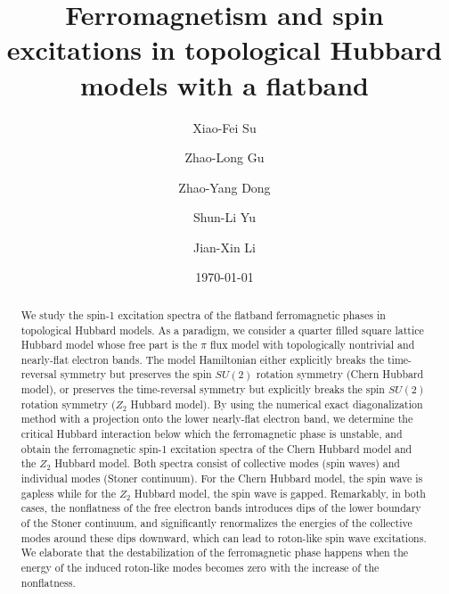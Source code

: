 \documentclass[amsmath,superscriptaddress,showpacs,aps,prb,twocolumn]{revtex4-1}
\begin{document}
\title{Ferromagnetism and spin excitations in topological Hubbard models with a flatband}
\author{Xiao-Fei Su}
\author{Zhao-Long Gu}
\author{Zhao-Yang Dong}
\author{Shun-Li Yu}
\author{Jian-Xin Li}
\date{\today}

\begin{abstract}
\par We study the spin-1 excitation spectra of the flatband ferromagnetic phases in topological Hubbard models. As a paradigm, we consider a quarter filled square lattice Hubbard model whose free part is the $\pi$ flux model with topologically nontrivial and nearly-flat electron bands. The model Hamiltonian either explicitly breaks the time-reversal symmetry but preserves the spin $SU(2)$ rotation symmetry (Chern Hubbard model), or preserves the time-reversal symmetry but explicitly breaks the spin $SU(2)$ rotation symmetry ($Z_2$ Hubbard model). By using the numerical exact diagonalization method with a projection onto the lower nearly-flat electron band, we determine the critical Hubbard interaction below which the ferromagnetic phase is unstable, and obtain the ferromagnetic spin-1 excitation spectra of the Chern Hubbard model and the $Z_2$ Hubbard model. Both spectra consist of collective modes (spin waves) and individual modes (Stoner continuum). For the Chern Hubbard model, the spin wave is gapless while for the $Z_2$ Hubbard model, the spin wave is gapped. Remarkably, in both cases, the nonflatness of the free electron bands introduces dips of the lower boundary of the Stoner continuum, and significantly renormalizes the energies of the collective modes around these dips downward, which can lead to roton-like spin wave excitations. We elaborate that the destabilization of the ferromagnetic phase happens when the energy of the induced roton-like modes becomes zero with the increase of the nonflatness.
\end{abstract}
\maketitle
\end{document}
